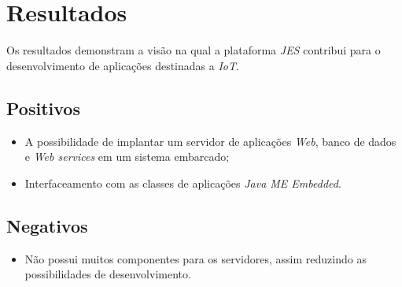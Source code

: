 \section{Resultados}

Os resultados demonstram a visão na qual a plataforma \textit{JES} contribui
para o desenvolvimento de aplicações destinadas a \textit{IoT}.

\subsection{Positivos}

\begin{itemize}

    \item A possibilidade de implantar um servidor de aplicações \textit{Web},
    banco de dados e \textit{Web services} em um sistema embarcado;

    \item Interfaceamento com as classes de aplicações \textit{Java ME
    Embedded}.

\end{itemize}

\subsection{Negativos}

\begin{itemize}

    \item Não possui muitos componentes para os servidores, assim reduzindo as
    possibilidades de desenvolvimento.

\end{itemize}
